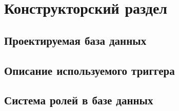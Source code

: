 \chapter{Конструкторский раздел}


\section{Проектируемая база данных}
\section{Описание используемого триггера}
\section{Система ролей в базе данных}



